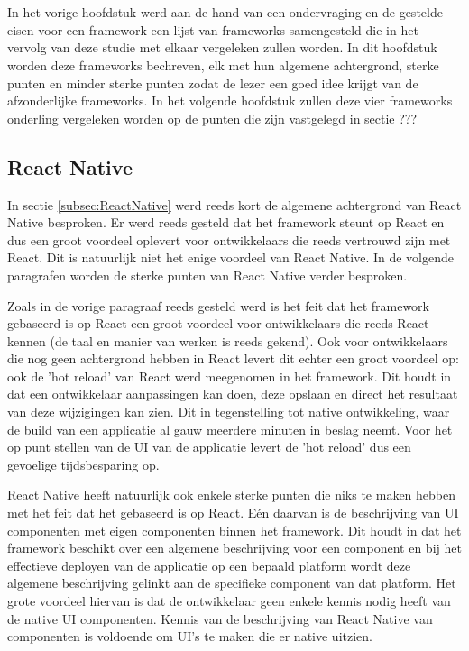 \chapter{}
\label{ch:eigenschappen-frameworks}

In het vorige hoofdstuk werd aan de hand van een ondervraging \autocite{Liu2020} en de gestelde eisen voor een framework een lijst van frameworks samengesteld die in het vervolg van deze studie met elkaar vergeleken zullen worden. In dit hoofdstuk worden deze frameworks bechreven, elk met hun algemene achtergrond, sterke punten en minder sterke punten zodat de lezer een goed idee krijgt van de afzonderlijke frameworks. In het volgende hoofdstuk zullen deze vier frameworks onderling vergeleken worden op de punten die zijn vastgelegd in sectie ???

\section{React Native}
\label{sec:detailsReactNative}

In sectie \ref{subsec:ReactNative} werd reeds kort de algemene achtergrond van React Native besproken. Er werd reeds gesteld dat het framework steunt op React en dus een groot voordeel oplevert voor ontwikkelaars die reeds vertrouwd zijn met React. Dit is natuurlijk niet het enige voordeel van React Native. In de volgende paragrafen worden de sterke punten van React Native verder besproken.

Zoals in de vorige paragraaf reeds gesteld werd is het feit dat het framework gebaseerd is op React een groot voordeel voor ontwikkelaars die reeds React kennen (de taal en manier van werken is reeds gekend). Ook voor ontwikkelaars die nog geen achtergrond hebben in React levert dit echter een groot voordeel op: ook de 'hot reload' van React werd meegenomen in het framework. Dit houdt in dat een ontwikkelaar aanpassingen kan doen, deze opslaan en direct het resultaat van deze wijzigingen kan zien. Dit in tegenstelling tot native ontwikkeling, waar de build van een applicatie al gauw meerdere minuten in beslag neemt. Voor het op punt stellen van de UI van de applicatie levert de 'hot reload' dus een gevoelige tijdsbesparing op.

React Native heeft natuurlijk ook enkele sterke punten die niks te maken hebben met het feit dat het gebaseerd is op React. Eén daarvan is de beschrijving van UI componenten met eigen componenten binnen het framework. Dit houdt in dat het framework beschikt over een algemene beschrijving voor een component en bij het effectieve deployen van de applicatie op een bepaald platform wordt deze algemene beschrijving gelinkt aan de specifieke component van dat platform. Het grote voordeel hiervan is dat de ontwikkelaar geen enkele kennis nodig heeft van de native UI componenten. Kennis van de beschrijving van React Native van componenten is voldoende om UI's te maken die er native uitzien. 


